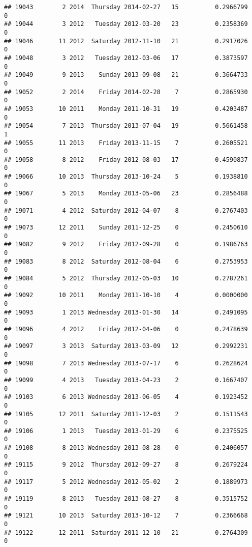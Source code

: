 \documentclass[
]{article}
\begin{document}
\begin{verbatim}
## 19043        2 2014  Thursday 2014-02-27   15          0.2966799             0
## 19044        3 2012   Tuesday 2012-03-20   23          0.2358369             0
## 19046       11 2012  Saturday 2012-11-10   21          0.2917026             0
## 19048        3 2012   Tuesday 2012-03-06   17          0.3873597             0
## 19049        9 2013    Sunday 2013-09-08   21          0.3664733             0
## 19052        2 2014    Friday 2014-02-28    7          0.2865930             0
## 19053       10 2011    Monday 2011-10-31   19          0.4203487             0
## 19054        7 2013  Thursday 2013-07-04   19          0.5661458             1
## 19055       11 2013    Friday 2013-11-15    7          0.2605521             0
## 19058        8 2012    Friday 2012-08-03   17          0.4590837             0
## 19066       10 2013  Thursday 2013-10-24    5          0.1938810             0
## 19067        5 2013    Monday 2013-05-06   23          0.2856488             0
## 19071        4 2012  Saturday 2012-04-07    8          0.2767403             0
## 19073       12 2011    Sunday 2011-12-25    0          0.2450610             0
## 19082        9 2012    Friday 2012-09-28    0          0.1986763             0
## 19083        8 2012  Saturday 2012-08-04    6          0.2753953             0
## 19084        5 2012  Thursday 2012-05-03   10          0.2787261             0
## 19092       10 2011    Monday 2011-10-10    4          0.0000000             0
## 19093        1 2013 Wednesday 2013-01-30   14          0.2491095             0
## 19096        4 2012    Friday 2012-04-06    0          0.2478639             0
## 19097        3 2013  Saturday 2013-03-09   12          0.2992231             0
## 19098        7 2013 Wednesday 2013-07-17    6          0.2628624             0
## 19099        4 2013   Tuesday 2013-04-23    2          0.1667407             0
## 19103        6 2013 Wednesday 2013-06-05    4          0.1923452             0
## 19105       12 2011  Saturday 2011-12-03    2          0.1511543             0
## 19106        1 2013   Tuesday 2013-01-29    6          0.2375525             0
## 19108        8 2013 Wednesday 2013-08-28    0          0.2406057             0
## 19115        9 2012  Thursday 2012-09-27    8          0.2679224             0
## 19117        5 2012 Wednesday 2012-05-02    2          0.1889973             0
## 19119        8 2013   Tuesday 2013-08-27    8          0.3515752             0
## 19121       10 2013  Saturday 2013-10-12    7          0.2366668             0
## 19122       12 2011  Saturday 2011-12-10   21          0.2764309             0

\end{verbatim}
\end{document}

